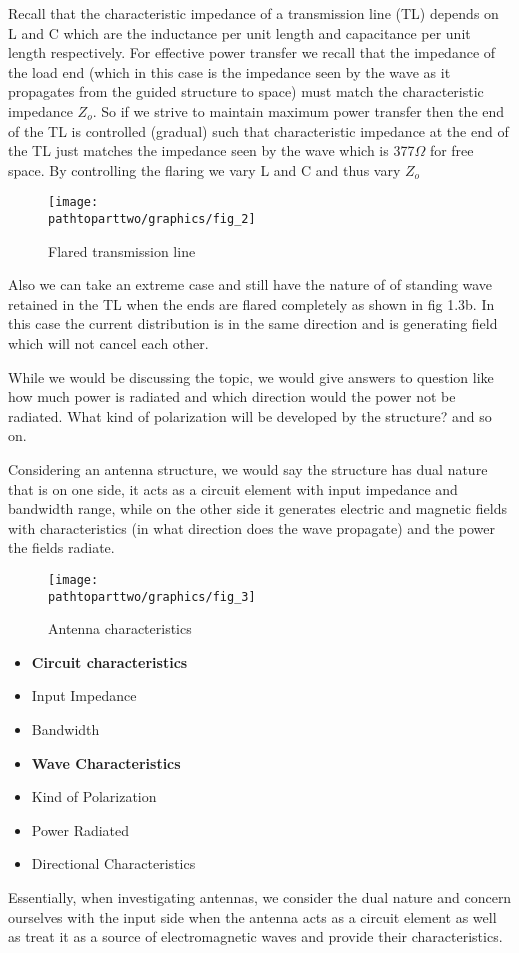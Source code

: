 Recall that the characteristic impedance of a transmission line (TL) depends on L and C which are the inductance per unit length and capacitance per unit length respectively. For effective power transfer we recall that the impedance of the load end (which in this case is the impedance seen by the wave as it propagates from the guided structure to space) must match the characteristic impedance $Z_o$. So if we strive to maintain maximum power transfer then the end of the TL is controlled (gradual) such that characteristic impedance at the end of the TL just matches the impedance seen by the wave which is 377$\Omega$ for free space.
By controlling the flaring we vary L and C and thus vary $Z_o$
\begin{figure}
\centering
\texttt{[image: \\pathtoparttwo/graphics/fig\_2]}
\caption{Flared transmission line}
\end{figure}
Also we can take an extreme case and still have the nature of of standing wave retained in the TL when the ends are flared completely as shown in fig 1.3b. In this case the current distribution is in the same direction and is generating field which will not cancel each other.

While we would be discussing the topic, we would give answers to question like how much power is radiated and which direction would the power not be radiated. What kind of polarization will be developed by the structure? and so on.

Considering an antenna structure, we would say the structure has dual nature that is on one side, it acts as a circuit element with input impedance and bandwidth range, while on the other side it generates electric and magnetic fields with characteristics (in what direction does the wave propagate) and the power the fields radiate.
\begin{figure}
\centering
\texttt{[image: \\pathtoparttwo/graphics/fig\_3]}
\caption{Antenna characteristics}
\end{figure}

\begin{itemize}
\item \textbf{Circuit characteristics}
\item Input Impedance
\item Bandwidth
\end{itemize}

\begin{itemize}
\item \textbf{Wave Characteristics}
\item Kind of Polarization
\item Power Radiated
\item Directional Characteristics
\end{itemize}
Essentially, when investigating antennas, we consider the dual nature and concern ourselves with the input side when the antenna acts as a circuit element as well as treat it as a source of electromagnetic waves and provide their characteristics. 

